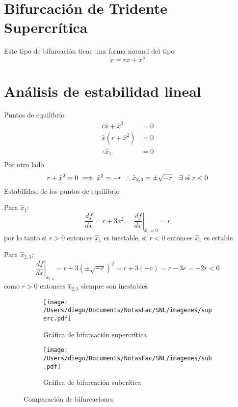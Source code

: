 \section{Bifurcación de Tridente Supercrítica}

Este tipo de bifurcación tiene una forma normal del tipo  $$      
\dot{{x}} {=rx+x^3}$$

\section*{Análisis de estabilidad lineal}
Puntos de equilibrio
$$
\begin{aligned}
  r\hat{x}+\hat{x}^{3} &= 0 \\
  \hat{x}(r+\hat{x}^2) &= 0 \\
  \therefore \hat{x}_1 &= 0 \\
\end{aligned}                       
$$
Por otro lado  $$
r+\hat{x}^2=0 \implies \hat{x}^2 =-r \\\ \therefore \hat{x}_{2,3}= \pm \sqrt{-r} \quad \exists \text{ si } r<0
$$
Estabilidad de los puntos de equilibrio

Para $\hat{x}_1$:
$$
\frac{df}{dx}=r+3x^2, \quad \left. \frac{df}{dx}\right|_{\hat{x}_1=0}=r
$$                                                             
por lo tanto si $r>0$ entonces $\hat{x}_1$ es inestable, si $r<0$ entonces $\hat{x}_1$ es estable.

Para $\hat{x}_{2,3}$:
 $$
 \left. \frac{df}{dx} \right|_{\hat{x}_{2,3}}=r+3(\pm \sqrt{-r})^2=r+3(-r)=r-3r=-2r<0 
$$
como $r>0$ entonces  $\hat{x}_{2,3}$ siempre son inestables

\begin{figure}[!tbp]
  \begin{subfigure}[b]{0.35\textwidth}
    \texttt{[image: /Users/diego/Documents/NotasFac/SNL/imagenes/superc.pdf]}
    \caption{Gráfica de bifurcación supercrítica}
  \end{subfigure}
  \hfill
  \begin{subfigure}[b]{0.35\textwidth}
    \texttt{[image: /Users/diego/Documents/NotasFac/SNL/imagenes/sub.pdf]}
    \caption{Gráfica de bifurcación subcrítica}
  \end{subfigure}
  \caption{Comparación de bifurcaciones}
\end{figure}


